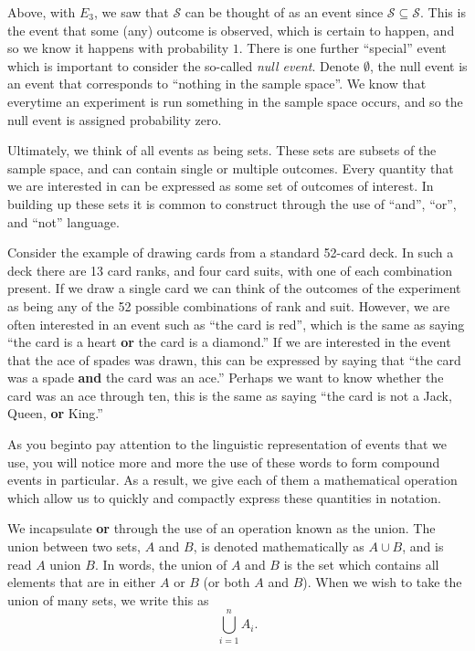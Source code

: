 \documentclass[
  letterpaper,
  DIV=11,
  numbers=noendperiod]{scrreprt}
\begin{document}
Above, with \(E_3\), we saw that \(\mathcal{S}\) can be thought of as an
event since \(\mathcal{S} \subseteq \mathcal{S}\). This is the event
that some (any) outcome is observed, which is certain to happen, and so
we know it happens with probability \(1\). There is one further
``special'' event which is important to consider the so-called
\emph{null event}. Denote \(\emptyset\), the null event is an event that
corresponds to ``nothing in the sample space''. We know that everytime
an experiment is run something in the sample space occurs, and so the
null event is assigned probability zero.

Ultimately, we think of all events as being sets. These sets are subsets
of the sample space, and can contain single or multiple outcomes. Every
quantity that we are interested in can be expressed as some set of
outcomes of interest. In building up these sets it is common to
construct through the use of ``and'', ``or'', and ``not'' language.

Consider the example of drawing cards from a standard 52-card deck. In
such a deck there are 13 card ranks, and four card suits, with one of
each combination present. If we draw a single card we can think of the
outcomes of the experiment as being any of the 52 possible combinations
of rank and suit. However, we are often interested in an event such as
``the card is red'', which is the same as saying ``the card is a heart
\textbf{or} the card is a diamond.'' If we are interested in the event
that the ace of spades was drawn, this can be expressed by saying that
``the card was a spade \textbf{and} the card was an ace.'' Perhaps we
want to know whether the card was an ace through ten, this is the same
as saying ``the card is not a Jack, Queen, \textbf{or} King.''

As you beginto pay attention to the linguistic representation of events
that we use, you will notice more and more the use of these words to
form compound events in particular. As a result, we give each of them a
mathematical operation which allow us to quickly and compactly express
these quantities in notation.

We incapsulate \textbf{or} through the use of an operation known as the
union. The union between two sets, \(A\) and \(B\), is denoted
mathematically as \(A \cup B\), and is read \(A\) union \(B\). In words,
the union of \(A\) and \(B\) is the set which contains all elements that
are in either \(A\) or \(B\) (or both \(A\) and \(B\)). When we wish to
take the union of many sets, we write this as \[\bigcup_{i=1}^n A_i.\]
\end{document}
